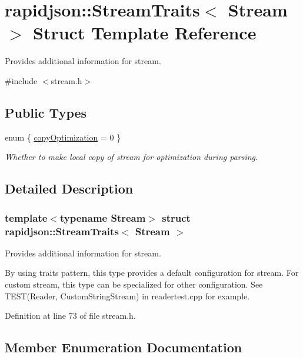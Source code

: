 \hypertarget{structrapidjson_1_1_stream_traits}{}\section{rapidjson\+::Stream\+Traits$<$ Stream $>$ Struct Template Reference}
\label{structrapidjson_1_1_stream_traits}


Provides additional information for stream.  




{\ttfamily \#include $<$stream.\+h$>$}

\subsection*{Public Types}
\begin{DoxyCompactItemize}
\item 
enum \{ \mbox{\hyperlink{structrapidjson_1_1_stream_traits_aea5a3f90ea4fd2a1b9c9c9954294474daf6f7f81d1e208f1041e618b57e0d3828}{copy\+Optimization}} = 0
 \}
\begin{DoxyCompactList}\small\item\em Whether to make local copy of stream for optimization during parsing. \end{DoxyCompactList}\end{DoxyCompactItemize}


\subsection{Detailed Description}
\subsubsection*{template$<$typename Stream$>$\newline
struct rapidjson\+::\+Stream\+Traits$<$ Stream $>$}

Provides additional information for stream. 

By using traits pattern, this type provides a default configuration for stream. For custom stream, this type can be specialized for other configuration. See T\+E\+S\+T(\+Reader, Custom\+String\+Stream) in readertest.\+cpp for example. 

Definition at line 73 of file stream.\+h.



\subsection{Member Enumeration Documentation}
\mbox{\label{structrapidjson_1_1_stream_traits_aea5a3f90ea4fd2a1b9c9c9954294474d}} 
